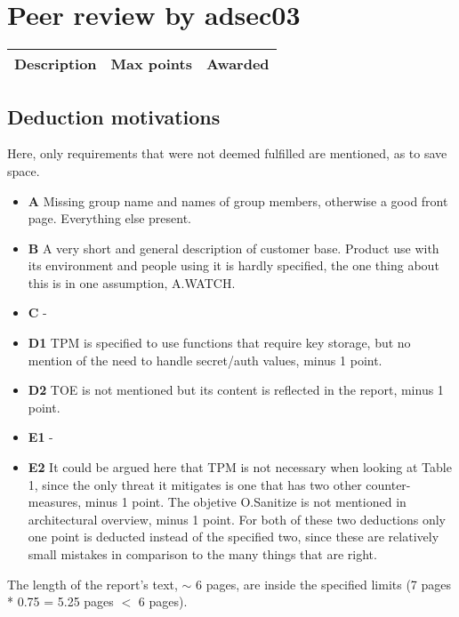 \documentclass{article}
\begin{document}
	\section{Peer review by adsec03}
	 \begin{tabular}{| l | c | c |}
        \hline
        \textbf{Description} & \textbf{Max points} & \textbf{Awarded} \\
        \hline
        \hline
        
    \end{tabular}
    

    \subsection{Deduction motivations}
      Here, only requirements that were not deemed fulfilled are mentioned, as to save space.
      
    	\begin{itemize}
    		\item{\textbf{A} Missing group name and names of group members, otherwise a good front page. Everything else present.}
    		\item{\textbf{B} A very short and general description of customer base. Product use with its environment and people using it
    			is hardly specified, the one thing about this is in one assumption, A.WATCH.}
    		\item{\textbf{C} -}
    		\item{\textbf{D1} TPM is specified to use functions that require key storage, but no mention of the need to handle secret/auth values, minus 1 point.}
    		\item{\textbf{D2} TOE is not mentioned but its content is reflected in the report, minus 1 point.}
    		\item{\textbf{E1} - }
    		\item{\textbf{E2} It could be argued here that TPM is not necessary when looking at Table 1, since the only threat it mitigates is one that 
    			has two other counter-measures, minus 1 point. The objetive O.Sanitize is not mentioned in architectural overview, minus 1 point. 
    			For both of these two deductions only one point is deducted instead of the specified two, since these are relatively small mistakes in comparison to the many things that are right.}
    	\end{itemize}
    	
    	The length of the report's text, $\sim$ 6 pages, are inside the specified limits (7 pages * 0.75 = 5.25 pages $<$ 6 pages).
\end{document}
